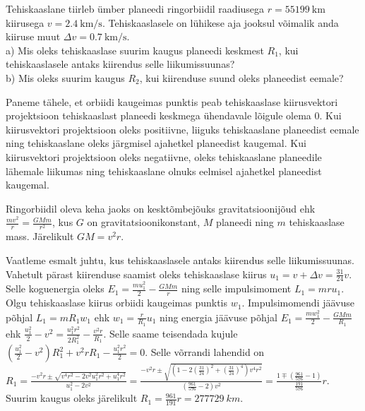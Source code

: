 
Tehiskaaslane tiirleb ümber planeedi ringorbiidil raadiusega $r=\SI{55199}{\km}$ kiirusega $v=\SI{2.4}{\km\per\s}$. Tehiskaaslasele on lühikese aja jooksul võimalik anda kiiruse muut $\Delta v=\SI{0.7}{\km\per\s}$.
\\a) Mis oleks tehiskaaslase suurim kaugus planeedi keskmest $R_1$, kui tehiskaaslasele antaks kiirendus selle liikumissuunas?
\\b) Mis oleks suurim kaugus $R_2$, kui kiirenduse suund oleks planeedist eemale?


\hint

\solu
\par
Paneme tähele, et orbiidi kaugeimas punktis peab tehiskaaslase kiirusvektori projektsioon tehiskaaslast planeedi keskmega ühendavale lõigule olema $0$. Kui kiirusvektori projektsioon oleks positiivne, liiguks tehiskaaslane planeedist eemale ning tehiskaaslane oleks järgmisel ajahetkel planeedist kaugemal. Kui kiirusvektori projektsioon oleks negatiivne, oleks tehiskaaslane planeedile lähemale liikumas ning tehiskaaslane olnuks eelmisel ajahetkel planeedist kaugemal.

Ringorbiidil oleva keha jaoks on kesktõmbejõuks gravitatsioonijõud ehk $\frac{mv^2}{r}=\frac{GMm}{r^2}$, kus $G$ on gravitatsioonikonstant, $M$ planeedi ning $m$ tehiskaaslase mass. Järelikult $GM=v^2r$.

Vaatleme esmalt juhtu, kus tehiskaaslasele antaks kiirendus selle liikumissuunas. Vahetult pärast kiirenduse saamist oleks tehiskaaslase kiirus $u_1=v+\Delta v=\frac{31}{24}v$. Selle koguenergia oleks $E_1=\frac{mu_1^2}{2}-\frac{GMm}{r}$ ning selle impulsimoment $L_1=mru_1$. Olgu tehiskaaslase kiirus orbiidi kaugeimas punktis $w_1$. Impulsimomendi jäävuse põhjal $L_1=mR_1w_1$ ehk $w_1=\frac{r}{R_1}u_1$ ning energia jäävuse põhjal $E_1=\frac{mw_1^2}{2}-\frac{GMm}{R_1}$ ehk $\frac{u_1^2}{2}-v^2=\frac{u_1^2r^2}{2R_1^2}-\frac{v^2r}{R_1}$. Selle saame teisendada kujule $\left(\frac{u_1^2}{2}-v^2\right)R_1^2+v^2rR_1-\frac{u_1^2r^2}{2}=0$. Selle võrrandi lahendid on $R_1=\frac{-v^2r\pm\sqrt{v^4r^2-2v^2u_1^2r^2+u_1^4r^2}}{u_1^2-2v^2}=\frac{-v^2r\pm\sqrt{\left(1-2\left(\frac{31}{24}\right)^2+\left(\frac{31}{24}\right)^4\right)v^4r^2}}{\left(\frac{961}{576}-2\right)v^2}=\frac{1\mp\left(\frac{961}{576}-1\right)}{\frac{191}{576}}r$. Suurim kaugus oleks järelikult $R_1=\frac{961}{191}r=\SI{277729}{km}$.

